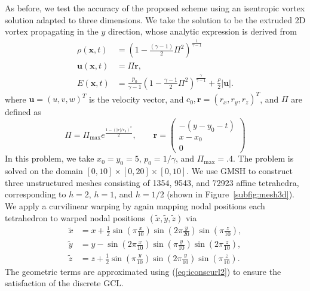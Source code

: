 \documentclass[10pt]{amsart}
\theoremstyle{definition}
\theoremstyle{lemma}
\theoremstyle{theorem}
\theoremstyle{assumption}
\renewcommand{\tilde}{\widetilde}
\newcommand{\LRp}[1]{\left( #1 \right)}
\newcommand{\LRb}[1]{\left| #1 \right|}
\begin{document}
{As before, we test the accuracy of the proposed scheme using an isentropic vortex solution adapted to three dimensions.  We take the solution to be the extruded 2D vortex propagating in the $y$ direction, whose analytic expression is derived from \cite{williams2013nodal}
\begin{align*}
\rho(\bm{x},t) &= \LRp{1-\frac{(\gamma-1)}{2}\Pi^2}^{\frac{1}{\gamma-1}}\\
\bm{u}(\bm{x},t) &= \Pi \bm{r}, \\
E(\bm{x},t) &= \frac{p_0}{\gamma-1}\LRp{1-\frac{\gamma-1}{2}\Pi^2}^{\frac{\gamma}{\gamma-1}} + \frac{\rho}{2}\LRb{\bm{u}}.
\end{align*}
where $\bm{u} = (u,v,w)^T$ is the velocity vector, and $c_0, \bm{r} = (r_x, r_y, r_z)^T$, and $\Pi$ are defined as
\[
\Pi = \Pi_{\max}e^{\frac{1-\LRp{\LRb{\bm{r}}/r_0}^2}{2}}, \qquad \bm{r} = \begin{pmatrix}
-(y-y_0-t)\\
x-x_0\\
0
\end{pmatrix}
\]
In this problem, we take $x_0 = y_0 = 5$, $p_0 = {1}/{\gamma}$, and $\Pi_{\max} = .4$.  The problem is solved on the domain $[0,10]\times [0,20]\times [0,10]$.  
We use \textsc{GMSH} to construct three unstructured meshes consisting of 1354, 9543, and 72923 affine tetrahedra, corresponding to $h = 2$, $h = 1$, and $h = 1/2$ (shown in Figure~\ref{subfig:mesh3d}).  We apply a curvilinear warping by again mapping nodal positions each tetrahedron to warped nodal positions $(\tilde{x},\tilde{y},\tilde{z})$ via
\begin{align*}
\tilde{x} &= x + \frac{1}{2}\sin\LRp{\pi \frac{x}{10}}\sin\LRp{2\pi \frac{y}{20}}\sin\LRp{\pi \frac{z}{10}},\\
\tilde{y} &= y - \sin\LRp{2 \pi \frac{x}{10}}\sin\LRp{\pi \frac{y}{10}}\sin\LRp{2\pi \frac{z}{10}},\\
\tilde{z} &= z + \frac{1}{2}\sin\LRp{\pi \frac{y}{10}}\sin\LRp{2\pi \frac{y}{10}}\sin\LRp{\pi \frac{z}{10}}.
\end{align*} 
The geometric terms are approximated using (\ref{eq:iconscurl2}) to ensure the satisfaction of the discrete GCL.  

}
\end{document}
